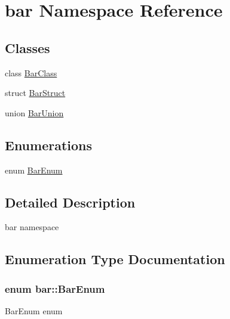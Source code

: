 \hypertarget{namespacebar}{}\section{bar Namespace Reference}
\label{namespacebar}
\subsection*{Classes}
\begin{DoxyCompactItemize}
\item 
class \hyperlink{classbar_1_1BarClass}{Bar\+Class}
\item 
struct \hyperlink{structbar_1_1BarStruct}{Bar\+Struct}
\item 
union \hyperlink{unionbar_1_1BarUnion}{Bar\+Union}
\end{DoxyCompactItemize}
\subsection*{Enumerations}
\begin{DoxyCompactItemize}
\item 
enum \hyperlink{namespacebar_ac202785cbcb1448c4ec217a50d4b0d6a}{Bar\+Enum} 
\end{DoxyCompactItemize}


\subsection{Detailed Description}
bar namespace 

\subsection{Enumeration Type Documentation}
\subsubsection[{\texorpdfstring{Bar\+Enum}{BarEnum}}]{\setlength{\rightskip}{0pt plus 5cm}enum {\bf bar\+::\+Bar\+Enum}}\hypertarget{namespacebar_ac202785cbcb1448c4ec217a50d4b0d6a}{}\label{namespacebar_ac202785cbcb1448c4ec217a50d4b0d6a}
Bar\+Enum enum 